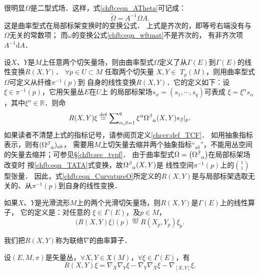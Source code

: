 很明显$\Omega$是二型式场．这样，式\eqref{chfb:eqn_ATheta}可记成：
\begin{equation}\label{chfb:eqn_TATA}
    \widetilde{\Omega} =A^{-1} \Omega A .
\end{equation}
这是曲率型式在局部标架变换时的变换公式．
上式是齐次的，即等号右端没有与$\Omega$无关的常数项；
而$\omega$的变换公式\eqref{chfb:eqn_wftmat}不是齐次的，
有非齐次项$A^{-1} \mathrm{d}A$．


设$X$、$Y$是$M$上任意两个切矢量场，则由曲率型式$\Omega$定义了从$\Gamma(E)$到$\Gamma(E)$的线性变换$R(X, Y)$．
$\forall p \in U\subset M$ 任取两个切矢量 $X, Y \in$ $T_p(M)$，则用曲率型式$\Omega$可定义从纤维$\pi^{-1}(p)$到
自身的线性变换$R(X, Y)$．它的定义如下：设 $\xi \in \pi^{-1}(p)$，它用矢量丛$E$在$U$上
的局部标架场$s_\alpha=\left(s_1, \cdots, s_q\right)$可表成
$\xi = \xi^\alpha s_{\alpha}$，其中$\xi^\alpha \in \mathbb{R}$．则命
\begin{equation}\label{chfb:eqn_CurvatureO}
    R(X, Y) \xi \overset{\mathrm {def}}{=}\sum\nolimits_{\alpha, \beta=1}^q \xi^\alpha 
    \Omega_{\hphantom{\alpha}\alpha}^\beta(X, Y) s_{\beta}|_p .
\end{equation}
如果读者不清楚上式的指标记号，请参阅\pageref{chccr:def_TCF}页定义\ref{chccr:def_TCF}．
如用抽象指标表示，则有$(\Omega_{\hphantom{\alpha}\alpha}^\beta)_{ab}$，
需要用$M$上切矢量去缩并两个抽象指标“${}_{ab}$”，不能用丛空间的矢量去缩并；可参见\S\ref{chfb:sec_tvpf}．
由于曲率型式$\Omega=\left(\Omega_{\hphantom{\alpha}\alpha}^\beta\right)$在局部标架场改变时
按\eqref{chfb:eqn_TATA}式变换，故$\Omega_{\hphantom{\alpha}\alpha}^\beta(X, Y)$是
线性空间$\pi^{-1}(p)$上的$\binom{1}{1}$型张量．
因此，式\eqref{chfb:eqn_CurvatureO}所定义的$R(X, Y)$是与局部标架选取无关的、从$\pi^{-1}(p)$到自身的线性变换．

如果$X$、$Y$是光滑流形$M$上的两个光滑切矢量场，则$R(X, Y)$是$\Gamma(E)$上的线性算子，
它的定义是：对任意的 $\xi \in \Gamma(E)$，及$p \in  M$，
\begin{equation}\label{chfb:eqn_RppR}
    \bigl(R(X, Y) \xi \bigr)(p)\overset{\mathrm {def}}{=}R\left(X_p, Y_p\right) \xi_p .
\end{equation}

我们把$R(X, Y)$称为联络$\nabla$的{\heiti 曲率算子}．

\begin{theorem}\label{chfb:thm_Riemann-Curvature}
    设$(E,M,\pi)$是矢量丛，$\forall X, Y\in \mathfrak{X}(M)$，$\forall \xi \in \Gamma(E)$，有
    \begin{equation}\label{chfb:eqn_Riemann-Curvature}
       R(X, Y)\xi=\nabla_X \nabla_Y\xi- \nabla_Y \nabla_X\xi-\nabla_{[X, Y]}\xi .
    \end{equation}
\end{theorem}

